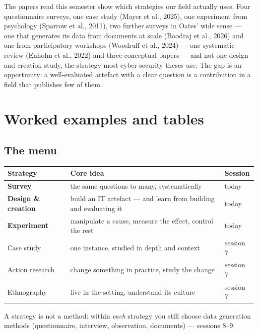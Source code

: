 \documentclass[11pt,a4paper,british,twoside=false,headings=small,chapterprefix=false,numbers=noenddot]{scrbook}
\begin{document}
The papers read this semester show which strategies our field actually uses. Four questionnaire surveys, one case study (Mayer et al., 2025), one experiment from psychology (Sparrow et al., 2011), two further surveys in Oates' wide sense --- one that generates its data from documents at scale (Boodraj et al., 2026) and one from participatory workshops (Woodruff et al., 2024) --- one systematic review (Enholm et al., 2022) and three conceptual papers --- and not one design and creation study, the strategy most cyber security theses use. The gap is an opportunity: a well-evaluated artefact with a clear question is a contribution in a field that publishes few of them.


\section{Worked examples and tables}

\subsection{The menu}
\begin{center}\small
\small
  \renewcommand{\arraystretch}{1.3}
  \begin{tabular}{@{}p{3.3cm}p{6.9cm}p{2.6cm}@{}}
    \toprule
    \textbf{Strategy} & \textbf{Core idea} & \textbf{Session}\\
    \midrule
    \textbf{Survey} & the same questions to many, systematically & today\\
    \textbf{Design \& creation} & build an IT artefact --- and learn from building and evaluating it & today\\
    \textbf{Experiment} & manipulate a cause, measure the effect, control the rest & today\\
    Case study & one instance, studied in depth and context & session 7\\
    Action research & change something in practice, study the change & session 7\\
    Ethnography & live in the setting, understand its culture & session 7\\
    \bottomrule
  \end{tabular}
  

  A strategy is not a method: within \emph{each} strategy you still choose
  data generation methods (questionnaire, interview, observation, documents)
  --- sessions 8--9.
\end{center}
\end{document}
